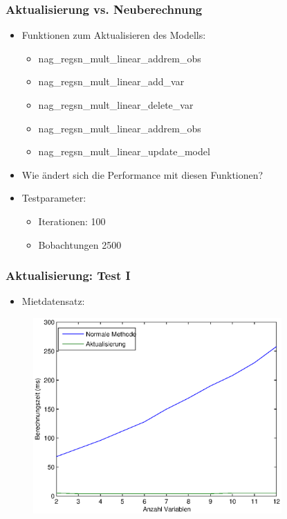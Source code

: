 \documentclass{beamer}
\begin{document}
\begin{frame}
  \frametitle{Aktualisierung vs. Neuberechnung}
    
  \begin{itemize}
  \item Funktionen zum Aktualisieren des Modells:
    \begin{itemize}
    \item nag\_regsn\_mult\_linear\_addrem\_obs
    \item \alert<3>{nag\_regsn\_mult\_linear\_add\_var}
    \item nag\_regsn\_mult\_linear\_delete\_var
    \item nag\_regsn\_mult\_linear\_addrem\_obs
    \item \alert<3>{nag\_regsn\_mult\_linear\_update\_model}
    \end{itemize}
  \end{itemize}

  \pause

  \begin{itemize}
  \item Wie ändert sich die Performance mit diesen Funktionen?
  \end{itemize}

  \pause

  \begin{itemize}
  \item Testparameter:
    \begin{itemize}
    \item Iterationen: 100
    \item Bobachtungen 2500
    \end{itemize}
  \end{itemize}

\end{frame}

\begin{frame}
  \frametitle{Aktualisierung: Test I}
  
  \begin{itemize}
  \item Mietdatensatz:
  \end{itemize}

  \begin{figure}[t]
    \centering
    \includegraphics[width=9.5cm]{figures/multi_reg_vars_2500_obs_act.eps}
  \end{figure}

\end{frame}
\end{document}
